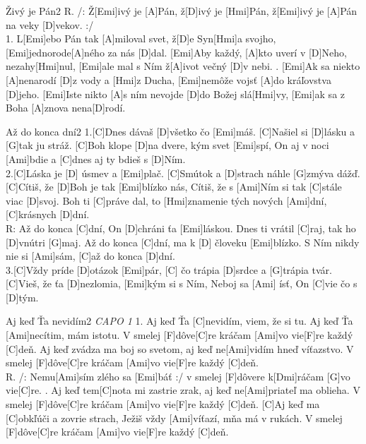 \documentclass[12pt]{article}
\begin{document}
\begin{song}{Živý je Pán}{2}
	R. /: Ž[Emi]ivý je [A]Pán, ž[D]ivý je [Hmi]Pán, 
	ž[Emi]ivý je [A]Pán na veky [D]vekov. :/
	\\
	1. L[Emi]ebo Pán tak [A]miloval svet, ž[D]e Syn[Hmi]a svojho,
	[Emi]jednorode[A]ného za nás [D]dal.
	[Emi]Aby každý, [A]kto uverí v [D]Neho, nezahy[Hmi]nul, 
	[Emi]ale mal s Ním ž[A]ivot večný [D]v nebi.
	. [Emi]Ak sa niekto [A]nenarodí [D]z vody a [Hmi]z Ducha,
	[Emi]nemôže vojsť [A]do kráľovstva [D]jeho.
	[Emi]Iste nikto [A]s ním nevojde [D]do Božej slá[Hmi]vy, 
	[Emi]ak sa z Boha [A]znova nena[D]rodí.
\end{song}
	
\begin{song}{Až do konca dní}{2}
	1.[C]Dnes dávaš [D]všetko čo [Emi]máš.
	[C]Našiel si [D]lásku a [G]tak ju stráž.
	[C]Boh klope [D]na dvere, kým svet [Emi]spí,
	On aj v noci [Ami]bdie 
	a [C]dnes aj ty bdieš s [D]Ním.
	\\
	2.[C]Láska je [D] úsmev a [Emi]plač.
	[C]Smútok a [D]strach náhle [G]zmýva dážď.
	[C]Cítiš, že [D]Boh je tak [Emi]blízko nás,
	Cítiš, že s [Ami]Ním 
	si tak [C]stále viac [D]svoj.
	\columnbreak
	Boh ti [C]práve dal,
	to [Hmi]znamenie tých nových [Ami]dní,
	[C]krásnych [D]dní.
	\\
	R: Až do konca [C]dní, On [D]chráni ťa [Emi]láskou.
	Dnes ti vrátil [C]raj, tak ho [D]vnútri [G]maj.
	Až do konca [C]dní, ma k [D] človeku [Emi]blízko.
	S Ním nikdy nie si [Ami]sám, [C]až do konca [D]dní.
	\\
	3.[C]Vždy príde [D]otázok [Emi]pár,
	[C] čo trápia [D]srdce a [G]trápia tvár.
	[C]Vieš, že ťa [D]nezlomia, [Emi]kým si s Ním, 
	Neboj sa [Ami] ísť, On [C]vie čo s [D]tým.
\end{song}
	
\begin{song}{Aj keď Ťa nevidím}{2}
	\textit{CAPO 1}
	1. Aj keď Ťa [C]nevidím, viem, že si tu.
	Aj keď Ťa [Ami]necítim, mám istotu.
	V smelej [F]dôve[C]re kráčam [Ami]vo vie[F]re každý [C]deň.
	Aj keď zvádza ma boj so svetom,
	aj keď ne[Ami]vidím hneď víťazstvo.
	V smelej [F]dôve[C]re kráčam [Ami]vo vie[F]re každý [C]deň.
	\\
	R. /: Nemu[Ami]sím zlého sa [Emi]báť :/
	v smelej [F]dôvere k[Dmi]ráčam [G]vo vie[C]re.
	. Aj keď tem[C]nota mi zastrie zrak,
	aj keď ne[Ami]priateľ ma oblieha.
	V smelej [F]dôve[C]re kráčam [Ami]vo vie[F]re každý [C]deň.
	[C]Aj keď ma [C]obkľúči a zovrie strach,
	Ježiš vždy [Ami]víťazí, mňa má v rukách.
	V smelej [F]dôve[C]re kráčam [Ami]vo vie[F]re každý [C]deň.
\end{song}
	
\end{document}
